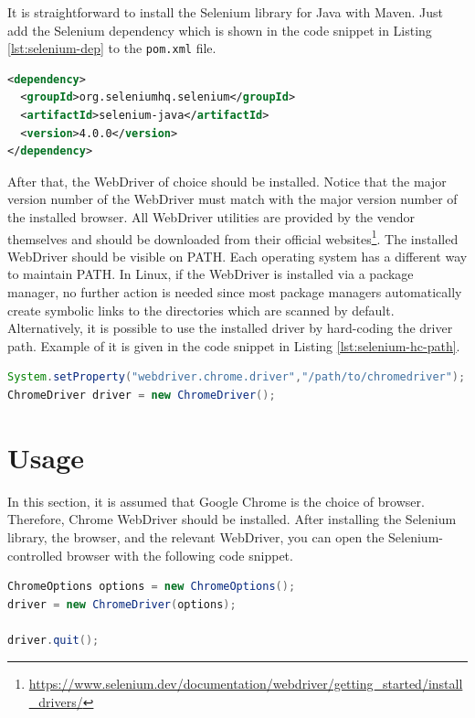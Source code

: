 It is straightforward to install the Selenium library for Java with Maven. Just add the Selenium dependency which is shown in the code snippet in Listing \ref{lst:selenium-dep} to the \lstinline[language={}]!pom.xml! file.

\begin{lstlisting}[language=XML,caption={The Selenium dependency for Maven.},label=lst:selenium-dep]
<dependency>
  <groupId>org.seleniumhq.selenium</groupId>
  <artifactId>selenium-java</artifactId>
  <version>4.0.0</version>
</dependency>
\end{lstlisting}

After that, the WebDriver of choice should be installed. Notice that the major version number of the WebDriver must match with the major version number of the installed browser. All WebDriver utilities are provided by the vendor themselves and should be downloaded from their official websites\footnote{\url{https://www.selenium.dev/documentation/webdriver/getting\_started/install\_drivers/}}. The installed WebDriver should be visible on PATH. Each operating system has a different way to maintain PATH. In Linux, if the WebDriver is installed via a package manager, no further action is needed since most package managers automatically create symbolic links to the directories which are scanned by default. Alternatively, it is possible to use the installed driver by hard-coding the driver path. Example of it is given in the code snippet in Listing \ref{lst:selenium-hc-path}.

\begin{lstlisting}[language=java,caption={Using the driver from a hard-coded path.},label=lst:selenium-hc-path]
System.setProperty("webdriver.chrome.driver","/path/to/chromedriver");
ChromeDriver driver = new ChromeDriver();
\end{lstlisting}

\section{Usage}
In this section, it is assumed that Google Chrome is the choice of browser. Therefore, Chrome WebDriver should be installed. After installing the Selenium library, the browser, and the relevant WebDriver, you can open the Selenium-controlled browser with the following code snippet.

\begin{lstlisting}[language=java,caption={Start a Selenium-controlled browser instance.}]
ChromeOptions options = new ChromeOptions();
driver = new ChromeDriver(options);

driver.quit();
\end{lstlisting}

